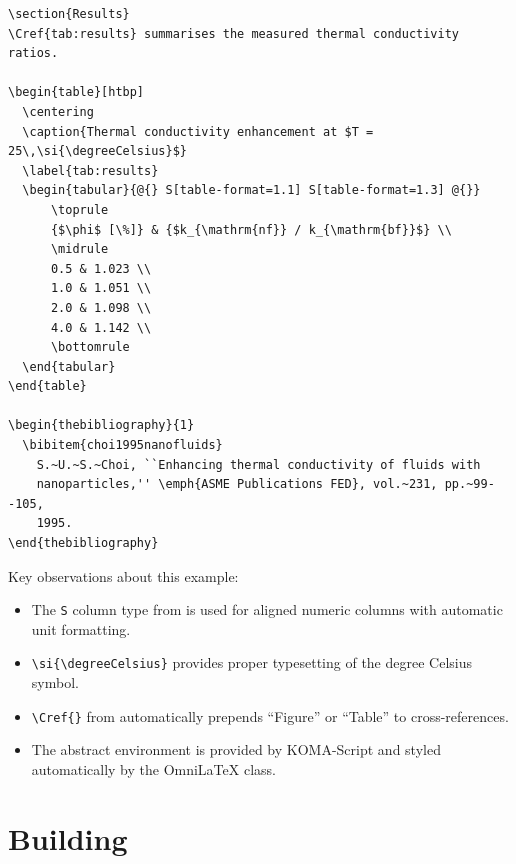 \begin{verbatim}
\section{Results}
\Cref{tab:results} summarises the measured thermal conductivity ratios.

\begin{table}[htbp]
  \centering
  \caption{Thermal conductivity enhancement at $T = 25\,\si{\degreeCelsius}$}
  \label{tab:results}
  \begin{tabular}{@{} S[table-format=1.1] S[table-format=1.3] @{}}
      \toprule
      {$\phi$ [\%]} & {$k_{\mathrm{nf}} / k_{\mathrm{bf}}$} \\
      \midrule
      0.5 & 1.023 \\
      1.0 & 1.051 \\
      2.0 & 1.098 \\
      4.0 & 1.142 \\
      \bottomrule
  \end{tabular}
\end{table}

\begin{thebibliography}{1}
  \bibitem{choi1995nanofluids}
    S.~U.~S.~Choi, ``Enhancing thermal conductivity of fluids with
    nanoparticles,'' \emph{ASME Publications FED}, vol.~231, pp.~99--105,
    1995.
\end{thebibliography}

\end{verbatim}

Key observations about this example:

\begin{itemize}
    \item The \texttt{S} column type from  is used for
          aligned numeric columns with automatic unit formatting.
    \item \texttt{\textbackslash si\{\textbackslash degreeCelsius\}} provides
          proper typesetting of the degree Celsius symbol.
    \item \texttt{\textbackslash Cref\{\}} from 
          automatically prepends ``Figure'' or ``Table'' to cross-references.
    \item The abstract environment is provided by KOMA-Script and styled
          automatically by the OmniLaTeX class.
\end{itemize}

\section{Building}

